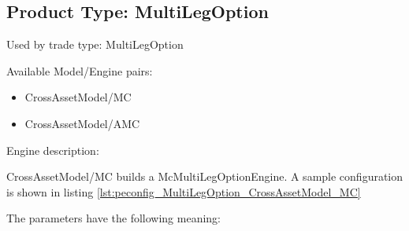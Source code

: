 \subsection{Product Type: MultiLegOption}

Used by trade type: MultiLegOption

Available Model/Engine pairs:

\begin{itemize}
\item CrossAssetModel/MC
\item CrossAssetModel/AMC
\end{itemize}

Engine description:

CrossAssetModel/MC builds a McMultiLegOptionEngine. A sample configuration is shown in listing
\ref{lst:peconfig_MultiLegOption_CrossAssetModel_MC}

The parameters have the following meaning:

